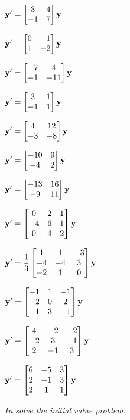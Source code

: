 \begin{exerciselistTwoColumn}

\item\label{exer:10.5.1}$\mathbf{y}'=\begin{bmatrix}3&4\\-1&7\end{bmatrix}\mathbf{y}$
\item\label{exer:10.5.2}$\mathbf{y}'=\begin{bmatrix}0&-1\\1&-2\end{bmatrix}\mathbf{y}$
\item\label{exer:10.5.3}$\mathbf{y}'=\begin{bmatrix}-7&4\\-1&-11\end{bmatrix}\mathbf{y}$
\item\label{exer:10.5.4}$\mathbf{y}'=\begin{bmatrix}3&1\\-1&1\end{bmatrix}\mathbf{y}$
\item\label{exer:10.5.5}$\mathbf{y}'=\begin{bmatrix}4&12\\-3&-8\end{bmatrix}\mathbf{y}$
\item\label{exer:10.5.6}$\mathbf{y}'=\begin{bmatrix}-10&9\\-4&2\end{bmatrix}\mathbf{y}$
\item\label{exer:10.5.7}$\mathbf{y}'=\begin{bmatrix}-13&16\\-9&11\end{bmatrix}\mathbf{y}$
\item\label{exer:10.5.8}$\mathbf{y}'=\begin{bmatrix}0&2&1\\-4&6&1\\0&4&2\end{bmatrix}\mathbf{y}$
\item\label{exer:10.5.9}$\mathbf{y}'=\dfrac{1}{3}\begin{bmatrix}1&1&-3\\-4&-4&3\\-2&1&0\end{bmatrix}\mathbf{y}$
\item\label{exer:10.5.10}$\mathbf{y}'=\begin{bmatrix}-1&1&-1\\-2&0&2\\-1&3&-1\end{bmatrix}\mathbf{y}$
\item\label{exer:10.5.11}$\mathbf{y}'=\begin{bmatrix}4&-2&-2\\-2&3&-1\\2&-1&3\end{bmatrix}\mathbf{y}$
\item\label{exer:10.5.12}$\mathbf{y}'=\begin{bmatrix}6&-5&3\\2&-1&3\\2&1&1\end{bmatrix}\mathbf{y}$
\end{exerciselistTwoColumn}
%
\textsl{In 
solve the initial value problem.}
